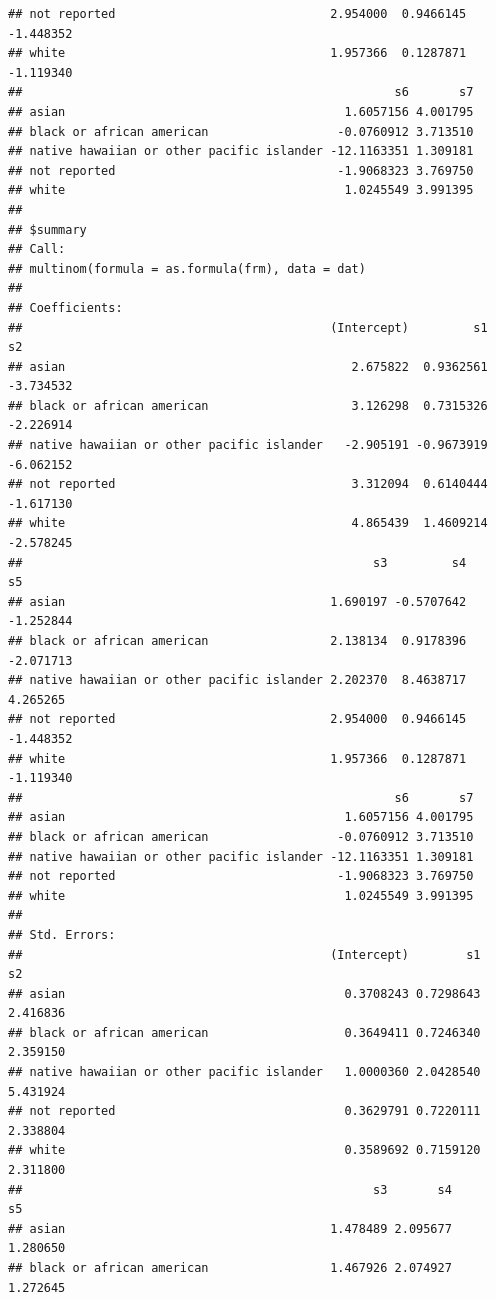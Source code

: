 \documentclass{article}\usepackage[]{graphicx}\usepackage[]{color}
\makeatletter
\newenvironment{kframe}{%
 \def\at@end@of@kframe{}%
 \ifinner\ifhmode%
  \def\at@end@of@kframe{\end{minipage}}%
  \begin{minipage}{\columnwidth}%
 \fi\fi%
 \def\FrameCommand##1{\hskip\@totalleftmargin \hskip-\fboxsep
 \colorbox{shadecolor}{##1}\hskip-\fboxsep
     \hskip-\linewidth \hskip-\@totalleftmargin \hskip\columnwidth}%
 \MakeFramed {\advance\hsize-\width
   \@totalleftmargin\z@ \linewidth\hsize
   \@setminipage}}%
 {\par\unskip\endMakeFramed%
 \at@end@of@kframe}
\newenvironment{knitrout}{}{} %
\makeatother
\begin{document}
\begin{knitrout}
\begin{kframe}
\begin{verbatim}
## not reported                              2.954000  0.9466145 -1.448352
## white                                     1.957366  0.1287871 -1.119340
##                                                    s6       s7
## asian                                       1.6057156 4.001795
## black or african american                  -0.0760912 3.713510
## native hawaiian or other pacific islander -12.1163351 1.309181
## not reported                               -1.9068323 3.769750
## white                                       1.0245549 3.991395
## 
## $summary
## Call:
## multinom(formula = as.formula(frm), data = dat)
## 
## Coefficients:
##                                           (Intercept)         s1        s2
## asian                                        2.675822  0.9362561 -3.734532
## black or african american                    3.126298  0.7315326 -2.226914
## native hawaiian or other pacific islander   -2.905191 -0.9673919 -6.062152
## not reported                                 3.312094  0.6140444 -1.617130
## white                                        4.865439  1.4609214 -2.578245
##                                                 s3         s4        s5
## asian                                     1.690197 -0.5707642 -1.252844
## black or african american                 2.138134  0.9178396 -2.071713
## native hawaiian or other pacific islander 2.202370  8.4638717  4.265265
## not reported                              2.954000  0.9466145 -1.448352
## white                                     1.957366  0.1287871 -1.119340
##                                                    s6       s7
## asian                                       1.6057156 4.001795
## black or african american                  -0.0760912 3.713510
## native hawaiian or other pacific islander -12.1163351 1.309181
## not reported                               -1.9068323 3.769750
## white                                       1.0245549 3.991395
## 
## Std. Errors:
##                                           (Intercept)        s1       s2
## asian                                       0.3708243 0.7298643 2.416836
## black or african american                   0.3649411 0.7246340 2.359150
## native hawaiian or other pacific islander   1.0000360 2.0428540 5.431924
## not reported                                0.3629791 0.7220111 2.338804
## white                                       0.3589692 0.7159120 2.311800
##                                                 s3       s4       s5
## asian                                     1.478489 2.095677 1.280650
## black or african american                 1.467926 2.074927 1.272645

\end{verbatim}
\end{kframe}
\end{knitrout}
\end{document}
